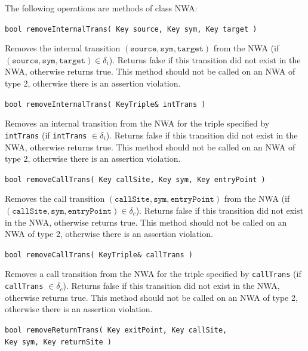 \documentclass{llncs}
\begin{document}
\noindent The following operations are methods of class NWA:

\begin{description}

  \item\texttt{bool removeInternalTrans( Key source, Key sym, Key target )} \nopagebreak

    Removes the internal transition
    $(\texttt{source},\texttt{sym},\texttt{target})$ from the NWA (if
    $(\texttt{source},\texttt{sym},\texttt{target}) \in \delta_i$).  Returns
    false if this transition did not exist in the NWA, otherwise returns
    true.  This method should not be called on an NWA of type 2, otherwise
    there is an assertion violation.

  \item\texttt{bool removeInternalTrans( KeyTriple\& intTrans )} \nopagebreak 

    Removes an internal transition from the NWA for the triple specified by
    \texttt{intTrans} (if \texttt{intTrans} $\in \delta_i$).  Returns false
    if this transition did not exist in the NWA, otherwise returns true.
    This method should not be called on an NWA of type 2, otherwise there is
    an assertion violation.

  \item\texttt{bool removeCallTrans( Key callSite, Key sym, Key entryPoint )} \nopagebreak

    Removes the call transition
    $(\texttt{callSite},\texttt{sym},\texttt{entryPoint})$ from the NWA (if
    $(\texttt{callSite},\texttt{sym},\texttt{entryPoint}) \in \delta_c$).
    Returns false if this transition did not exist in the NWA, otherwise
    returns true.  This method should not be called on an NWA of type 2,
    otherwise there is an assertion violation.
 
  \item\texttt{bool removeCallTrans( KeyTriple\& callTrans )} \nopagebreak

    Removes a call transition from the NWA for the triple specified by
    \texttt{callTrans} (if \texttt{callTrans} $\in \delta_c$).  Returns false
    if this transition did not exist in the NWA, otherwise returns true.
    This method should not be called on an NWA of type 2, otherwise there is
    an assertion violation.

  \item\texttt{bool removeReturnTrans( Key exitPoint, Key
    callSite,\\ \hspace*{3.25cm} Key sym, Key returnSite )} \nopagebreak


\end{description}
\end{document}
